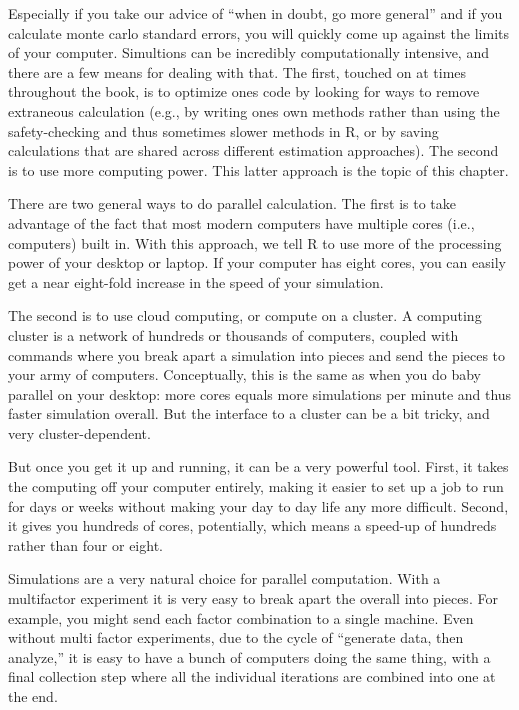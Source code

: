 \documentclass[
]{book}
\begin{document}
Especially if you take our advice of ``when in doubt, go more general'' and if you calculate monte carlo standard errors, you will quickly come up against the limits of your computer.
Simultions can be incredibly computationally intensive, and there are a few means for dealing with that.
The first, touched on at times throughout the book, is to optimize ones code by looking for ways to remove extraneous calculation (e.g., by writing ones own methods rather than using the safety-checking and thus sometimes slower methods in R, or by saving calculations that are shared across different estimation approaches).
The second is to use more computing power.
This latter approach is the topic of this chapter.

There are two general ways to do parallel calculation.
The first is to take advantage of the fact that most modern computers have multiple cores (i.e., computers) built in.
With this approach, we tell R to use more of the processing power of your desktop or laptop.
If your computer has eight cores, you can easily get a near eight-fold increase in the speed of your simulation.

The second is to use cloud computing, or compute on a cluster.
A computing cluster is a network of hundreds or thousands of computers, coupled with commands where you break apart a simulation into pieces and send the pieces to your army of computers.
Conceptually, this is the same as when you do baby parallel on your desktop: more cores equals more simulations per minute and thus faster simulation overall.
But the interface to a cluster can be a bit tricky, and very cluster-dependent.

But once you get it up and running, it can be a very powerful tool.
First, it takes the computing off your computer entirely, making it easier to set up a job to run for days or weeks without making your day to day life any more difficult.
Second, it gives you hundreds of cores, potentially, which means a speed-up of hundreds rather than four or eight.

Simulations are a very natural choice for parallel computation.
With a multifactor experiment it is very easy to break apart the overall into pieces.
For example, you might send each factor combination to a single machine.
Even without multi factor experiments, due to the cycle of ``generate data, then analyze,'' it is easy to have a bunch of computers doing the same thing, with a final collection step where all the individual iterations are combined into one at the end.
\end{document}

